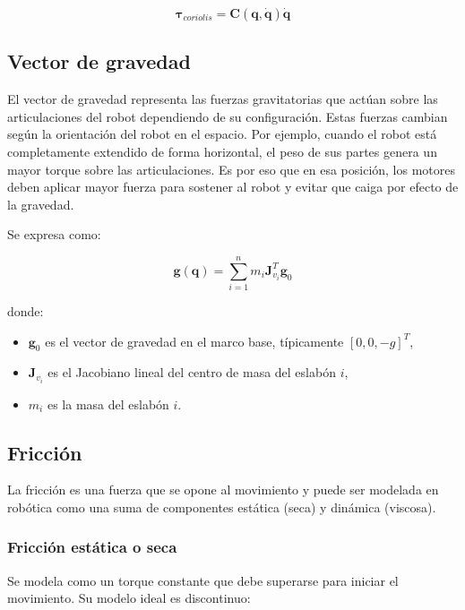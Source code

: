\begin{equation}
	\boldsymbol{\tau}_{coriolis} = \mathbf{C}(\mathbf{q}, \dot{\mathbf{q}})\dot{\mathbf{q}}
\end{equation}



\subsection{Vector de gravedad}

El vector de gravedad representa las fuerzas gravitatorias que actúan sobre las articulaciones del robot dependiendo de su configuración. Estas fuerzas cambian según la orientación del robot en el espacio. Por ejemplo, cuando el robot está completamente extendido de forma horizontal, el peso de sus partes genera un mayor torque sobre las articulaciones. Es por eso que en esa posición, los motores deben aplicar mayor fuerza para sostener al robot y evitar que caiga por efecto de la gravedad.

Se expresa como:

\begin{equation}
	\mathbf{g}(\mathbf{q}) = \sum_{i=1}^n m_i \mathbf{J}_{v_i}^T \mathbf{g}_0
\end{equation}

donde:
\begin{itemize}
	\item \(\mathbf{g}_0\) es el vector de gravedad en el marco base, típicamente \([0, 0, -g]^T\),
	\item \(\mathbf{J}_{v_i}\) es el Jacobiano lineal del centro de masa del eslabón \(i\),
	\item \(m_i\) es la masa del eslabón \(i\).
\end{itemize}




\subsection{Fricción}

La fricción es una fuerza que se opone al movimiento y puede ser modelada en robótica como una suma de componentes estática (seca) y dinámica (viscosa).

\subsubsection{Fricción estática o seca}

Se modela como un torque constante que debe superarse para iniciar el movimiento. Su modelo ideal es discontinuo:

